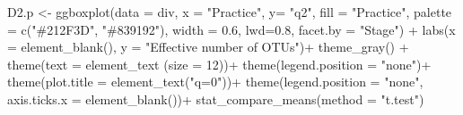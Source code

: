 \documentclass[]{interact}
\theoremstyle{plain}%
\theoremstyle{definition}
\theoremstyle{remark}
\newenvironment{Shaded}{\begin{snugshade}}{\end{snugshade}}
\newcommand{\AttributeTok}[1]{\textcolor[rgb]{0.77,0.63,0.00}{#1}}
\newcommand{\DecValTok}[1]{\textcolor[rgb]{0.00,0.00,0.81}{#1}}
\newcommand{\FloatTok}[1]{\textcolor[rgb]{0.00,0.00,0.81}{#1}}
\newcommand{\FunctionTok}[1]{\textcolor[rgb]{0.00,0.00,0.00}{#1}}
\newcommand{\NormalTok}[1]{#1}
\newcommand{\OtherTok}[1]{\textcolor[rgb]{0.56,0.35,0.01}{#1}}
\newcommand{\SpecialCharTok}[1]{\textcolor[rgb]{0.00,0.00,0.00}{#1}}
\newcommand{\StringTok}[1]{\textcolor[rgb]{0.31,0.60,0.02}{#1}}
\begin{document}
\begin{Shaded}
\begin{Highlighting}[]
\NormalTok{D2.p }\OtherTok{\textless{}{-}} \FunctionTok{ggboxplot}\NormalTok{(}\AttributeTok{data =}\NormalTok{ div, }\AttributeTok{x =} \StringTok{"Practice"}\NormalTok{, }\AttributeTok{y=} \StringTok{"q2"}\NormalTok{,}
                  \AttributeTok{fill =} \StringTok{"Practice"}\NormalTok{, }\AttributeTok{palette =} \FunctionTok{c}\NormalTok{(}\StringTok{"\#212F3D"}\NormalTok{, }\StringTok{"\#839192"}\NormalTok{), }
                  \AttributeTok{width =} \FloatTok{0.6}\NormalTok{, }\AttributeTok{lwd=}\FloatTok{0.8}\NormalTok{, }\AttributeTok{facet.by =} \StringTok{"Stage"}\NormalTok{)  }\SpecialCharTok{+}
  \FunctionTok{labs}\NormalTok{(}\AttributeTok{x =} \FunctionTok{element\_blank}\NormalTok{(), }\AttributeTok{y =} \StringTok{"Effective number of OTUs"}\NormalTok{)}\SpecialCharTok{+}
  \FunctionTok{theme\_gray}\NormalTok{() }\SpecialCharTok{+}
  \FunctionTok{theme}\NormalTok{(}\AttributeTok{text =} \FunctionTok{element\_text}\NormalTok{ (}\AttributeTok{size =} \DecValTok{12}\NormalTok{))}\SpecialCharTok{+}
  \FunctionTok{theme}\NormalTok{(}\AttributeTok{legend.position =} \StringTok{"none"}\NormalTok{)}\SpecialCharTok{+}
  \FunctionTok{theme}\NormalTok{(}\AttributeTok{plot.title =} \FunctionTok{element\_text}\NormalTok{(}\StringTok{"q=0"}\NormalTok{))}\SpecialCharTok{+}
  \FunctionTok{theme}\NormalTok{(}\AttributeTok{legend.position =} \StringTok{"none"}\NormalTok{,}
        \AttributeTok{axis.ticks.x =} \FunctionTok{element\_blank}\NormalTok{())}\SpecialCharTok{+}
  \FunctionTok{stat\_compare\_means}\NormalTok{(}\AttributeTok{method =} \StringTok{"t.test"}\NormalTok{)}


\end{Highlighting}
\end{Shaded}
\end{document}
